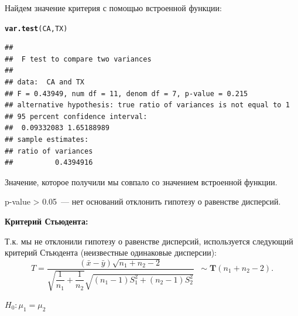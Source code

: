 \documentclass{article}\usepackage[]{graphicx}\usepackage[]{color}
\makeatletter
\newcommand{\hlstd}[1]{\textcolor[rgb]{0.345,0.345,0.345}{#1}}%
\newcommand{\hlkwd}[1]{\textcolor[rgb]{0.737,0.353,0.396}{\textbf{#1}}}%
\newenvironment{kframe}{%
 \def\at@end@of@kframe{}%
 \ifinner\ifhmode%
  \def\at@end@of@kframe{\end{minipage}}%
  \begin{minipage}{\columnwidth}%
 \fi\fi%
 \def\FrameCommand##1{\hskip\@totalleftmargin \hskip-\fboxsep
 \colorbox{shadecolor}{##1}\hskip-\fboxsep
     \hskip-\linewidth \hskip-\@totalleftmargin \hskip\columnwidth}%
 \MakeFramed {\advance\hsize-\width
   \@totalleftmargin\z@ \linewidth\hsize
   \@setminipage}}%
 {\par\unskip\endMakeFramed%
 \at@end@of@kframe}
\newenvironment{knitrout}{}{} %
\makeatother
\begin{document}
Найдем значение критерия с помощью встроенной функции:

\begin{knitrout}
\color{fgcolor}\begin{kframe}
\begin{alltt}
\hlkwd{var.test}\hlstd{(CA, TX)}
\end{alltt}
\begin{verbatim}
## 
## 	F test to compare two variances
## 
## data:  CA and TX
## F = 0.43949, num df = 11, denom df = 7, p-value = 0.215
## alternative hypothesis: true ratio of variances is not equal to 1
## 95 percent confidence interval:
##  0.09332083 1.65188989
## sample estimates:
## ratio of variances 
##          0.4394916
\end{verbatim}
\end{kframe}
\end{knitrout}

Значение, которое получили мы совпало со значением встроенной функции.

p-value > 0.05~--- нет оснований отклонить гипотезу о равенстве дисперсий.

\newpage
\textbf{Критерий Стьюдента:}

Т.к. мы не отклонили гипотезу о равенстве дисперсий, используется следующий критерий Стьюдента (неизвестные одинаковые дисперсии):
$$ T = \dfrac{(\bar{x}- \bar{y})\sqrt{n_{1}+n_{2}-2}}{\sqrt{\dfrac{1}{n_{1}}+\dfrac{1}{n_{2}}}\sqrt{(n_{1}-1)S_{1}^{2}+(n_{2}-1)S_{2}^{2}}} \;\; \sim \mathbf{T}(n_{1}+n_{2}-2).$$

$H_0: \mu_1 = \mu_2$
\end{document}
